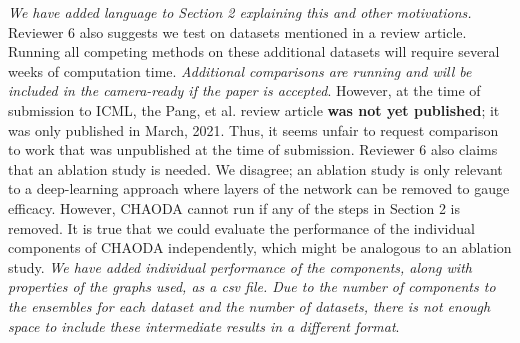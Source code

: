 \documentclass{article}
\begin{document}
\emph{We have added language to Section 2 explaining this and other motivations.}
Reviewer 6 also suggests we test on datasets mentioned in a review article.
Running all competing methods on these additional datasets will require several weeks of computation time.
\emph{Additional comparisons are running and will be included in the camera-ready if the paper is accepted}.
However, at the time of submission to ICML, the Pang, et al. review article \textbf{was not yet published}; it was only published in March, 2021.
Thus, it seems unfair to request comparison to work that was unpublished at the time of submission.
Reviewer 6 also claims that an ablation study is needed.
We disagree; an ablation study is only relevant to a deep-learning approach where layers of the network can be removed to gauge efficacy.
However, CHAODA cannot run if any of the steps in Section 2 is removed.
It is true that we could evaluate the performance of the individual components of CHAODA independently, which might be analogous to an ablation study.
\emph{We have added individual performance of the components, along with properties of the graphs used, as a csv file. Due to the number of components to the ensembles for each dataset and the number of datasets, there is not enough space to include these intermediate results in a different format}.
\end{document}
